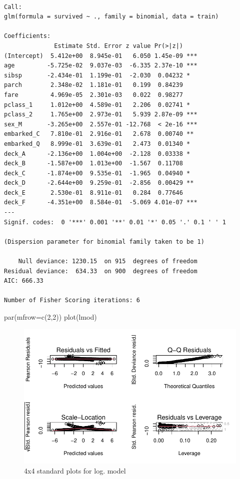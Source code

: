 \documentclass[
  letterpaper,
  DIV=11,
  numbers=noendperiod]{scrartcl}
\newenvironment{Shaded}{\begin{snugshade}}{\end{snugshade}}
\newcommand{\AttributeTok}[1]{\textcolor[rgb]{0.40,0.45,0.13}{#1}}
\newcommand{\DecValTok}[1]{\textcolor[rgb]{0.68,0.00,0.00}{#1}}
\newcommand{\FunctionTok}[1]{\textcolor[rgb]{0.28,0.35,0.67}{#1}}
\newcommand{\NormalTok}[1]{\textcolor[rgb]{0.00,0.23,0.31}{#1}}
\begin{document}
\begin{verbatim}

Call:
glm(formula = survived ~ ., family = binomial, data = train)

Coefficients:
              Estimate Std. Error z value Pr(>|z|)    
(Intercept)  5.412e+00  8.945e-01   6.050 1.45e-09 ***
age         -5.725e-02  9.037e-03  -6.335 2.37e-10 ***
sibsp       -2.434e-01  1.199e-01  -2.030  0.04232 *  
parch        2.348e-02  1.181e-01   0.199  0.84239    
fare         4.969e-05  2.301e-03   0.022  0.98277    
pclass_1     1.012e+00  4.589e-01   2.206  0.02741 *  
pclass_2     1.765e+00  2.973e-01   5.939 2.87e-09 ***
sex_M       -3.265e+00  2.557e-01 -12.768  < 2e-16 ***
embarked_C   7.810e-01  2.916e-01   2.678  0.00740 ** 
embarked_Q   8.999e-01  3.639e-01   2.473  0.01340 *  
deck_A      -2.136e+00  1.004e+00  -2.128  0.03338 *  
deck_B      -1.587e+00  1.013e+00  -1.567  0.11708    
deck_C      -1.874e+00  9.535e-01  -1.965  0.04940 *  
deck_D      -2.644e+00  9.259e-01  -2.856  0.00429 ** 
deck_E       2.530e-01  8.911e-01   0.284  0.77646    
deck_F      -4.351e+00  8.584e-01  -5.069 4.01e-07 ***
---
Signif. codes:  0 '***' 0.001 '**' 0.01 '*' 0.05 '.' 0.1 ' ' 1

(Dispersion parameter for binomial family taken to be 1)

    Null deviance: 1230.15  on 915  degrees of freedom
Residual deviance:  634.33  on 900  degrees of freedom
AIC: 666.33

Number of Fisher Scoring iterations: 6
\end{verbatim}

\begin{Shaded}
\begin{Highlighting}[]
\FunctionTok{par}\NormalTok{(}\AttributeTok{mfrow=}\FunctionTok{c}\NormalTok{(}\DecValTok{2}\NormalTok{,}\DecValTok{2}\NormalTok{))}
\FunctionTok{plot}\NormalTok{(lmod)}
\end{Highlighting}
\end{Shaded}

\begin{figure}[H]

{\centering \includegraphics{FinalProject_files/figure-pdf/unnamed-chunk-21-1.pdf}

}

\caption{4x4 standard plots for log. model}

\end{figure}%
\end{document}
